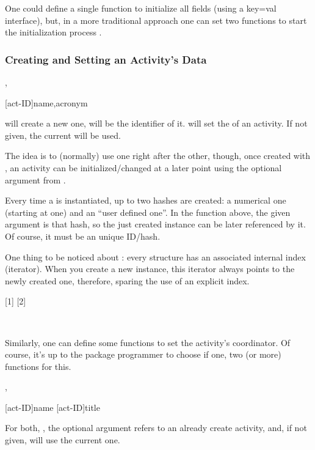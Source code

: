 \documentclass[10pt]{article}
\begin{document}
One could define a single function to initialize all fields (using a key=val interface), but, in a more traditional approach  one can set two functions to start the initialization process \tsobj{\NewActivity,\ActivitySet}. 


\subsubsection{Creating and Setting an Activity's Data}

\begin{codedescribe}{\NewActivity,\ActivitySet}
\begin{codesyntax}
  \tsmacro{\ActivitySet}[act-ID]{name,acronym}
\end{codesyntax}
\tsobj{\NewActivity} will create a new one,  will be the identifier of it. \tsobj{\ActivitySet} will set the  of an activity. If not given, the current  will be used.

The idea is to (normally) use one right after the other, though, once created with \tsobj{\NewActivity}, an activity can be initialized/changed at a later point using the optional argument from \tsobj{\ActivitySet}.

\end{codedescribe}
\begin{tsremark}
  Every time a  is instantiated, up to two hashes are created: a numerical one (starting at one) and an ``user defined one''. In the \tsobj{\NewActivity} function above, the given argument is that hash, so the just created instance can be later referenced by it. Of course, it must be an unique ID/hash.
\end{tsremark}
\begin{tsremark}
  One thing to be noticed about : every structure has an associated internal index (iterator). When you create a new instance, this iterator always points to the newly created one, therefore, sparing the use of an explicit index.
\end{tsremark}

[1]
[2]

~

Similarly, one can define some functions to set the activity's coordinator. Of course, it's up to the package programmer to choose if one, two (or more) functions for this.

\begin{codedescribe}{\ActivitySetCoord,\ActivitySetCoordTitle}
\begin{codesyntax}
  \tsmacro{\ActivitySetCoord}[act-ID]{name}
  \tsmacro{\ActivitySetCoordTitle}[act-ID]{title}
\end{codesyntax}
For both, \tsobj{\ActivitySetCoord,\ActivitySetCoordTitle}, the optional argument  refers to an already create activity, and, if not given, will use the current one.
\end{codedescribe}
\end{document}
